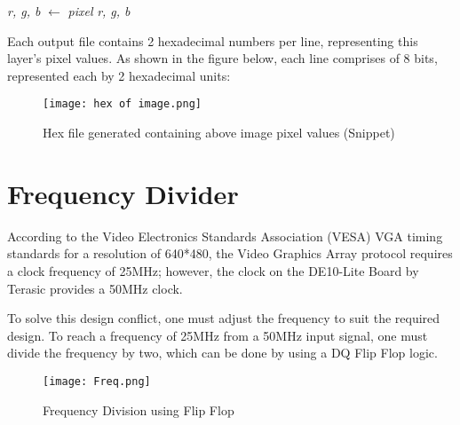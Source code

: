 \begin{algorithm}[H]
\begin{algorithmic}[1]
		 
		\State \textit{r, g, b} $\gets$ \textit{pixel}
		\State \Return \textit{r, g, b}
		\EndFunction
		
		 
		\State {}
		\State {}
		\State {}
		\EndFunction
		
		 
		\State {}
		\State {}
		\State {}
		\EndFunction
	\end{algorithmic}
\end{algorithm}

\par Each output file contains 2 hexadecimal numbers per line, representing this layer's pixel values. As shown in the figure below, each line comprises of 8 bits, represented each by 2 hexadecimal units: \newline

\begin{figure}[H]
    \centering
    \texttt{[image: hex of image.png]}
    \caption{Hex file generated containing above image pixel values (Snippet)}
    \label{fig:hexofimage}  
\end{figure}

\section{Frequency Divider}
\par According to the Video Electronics Standards Association (VESA) VGA timing standards for a resolution of 640*480, the Video Graphics Array protocol requires a clock frequency of 25MHz; however, the clock on the DE10-Lite Board by Terasic provides a 50MHz clock. \newline
\par To solve this design conflict, one must adjust the frequency to suit the required design. To reach a frequency of 25MHz from a 50MHz input signal, one must divide the frequency by two, which can be done by using a DQ Flip Flop logic. \newline

\begin{figure}[H]
	\centering
	\texttt{[image: Freq.png]}
	\caption{Frequency Division using Flip Flop \cite{figsix}}
	\label{fig:25to50}  
\end{figure}

